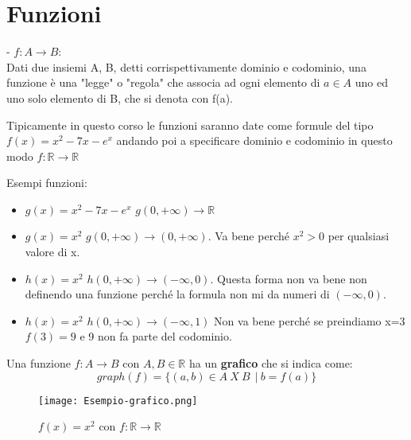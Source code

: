 \newpage
\section{Funzioni}
\begin{definition}[Funzione]
- $f: A \longrightarrow B$: \\
Dati due insiemi A, B, detti corrispettivamente dominio e codominio, una funzione è una "legge" o "regola" che associa ad ogni elemento di $a \in A$ uno ed uno solo elemento di B, che si denota con f(a).
\end{definition}
\begin{note}
Tipicamente in questo corso le funzioni saranno date come formule del tipo $f(x) = x^2 - 7x - e^x$ andando poi a specificare dominio e codominio in questo modo $f: \mathbb{R} \longrightarrow \mathbb{R}$
\end{note}
\begin{example}
    Esempi funzioni:
    \begin{itemize}
        \item $g(x) = x^2 - 7x - e^x$ \hspace{.3cm} $g(0,+\infty) \longrightarrow \mathbb{R}$
        \item $g(x) = x^2$ \hspace{.3cm} $g(0, +\infty) \longrightarrow (0, +\infty)$. \hspace{.3cm}Va bene perché $x^2 > 0$ per qualsiasi valore di x.
        \item $h(x) = x^2$ \hspace{.3cm} $h(0, +\infty) \longrightarrow (-\infty, 0)$. \hspace{.3cm}Questa forma non va bene non definendo una funzione perché la formula non mi da numeri di $(-\infty, 0)$.
        \item $h(x) = x^2$ \hspace{.3cm} $h(0, +\infty) \longrightarrow (-\infty,1)$ \hspace{.3cm}Non va bene perché se preindiamo x=3 $f(3) = 9$ e 9 non fa parte del codominio. 
    \end{itemize}
\end{example}
Una funzione $f: A \longrightarrow B$ con $A,B \in \mathbb{R}$ ha un \textbf{grafico} che si indica come:
\begin{equation}
    graph(f) = \{(a,b) \in A \:X\: B\ \:|\: b = f(a)\}
\end{equation}
\begin{wrapfigure}[8]{l}{7cm}
    \centering
    \texttt{[image: Esempio-grafico.png]}
    \caption{$f(x) = x^2$ con $f: \mathbb{R} \longrightarrow \mathbb{R}$}
    \label{fig:esempio-grafico}
\end{wrapfigure}
